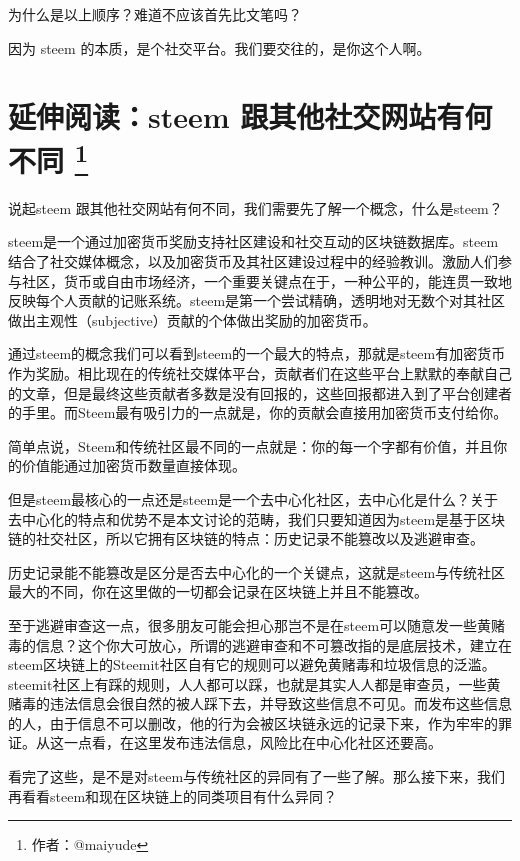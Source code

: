 \documentclass[]{ctexbook}
\begin{document}
为什么是以上顺序？难道不应该首先比文笔吗？

因为 steem 的本质，是个社交平台。我们要交往的，是你这个人啊。

\hypertarget{steem-}{%
\section[延伸阅读：steem 跟其他社交网站有何不同 ]{\texorpdfstring{延伸阅读：steem 跟其他社交网站有何不同 \footnote{作者：@maiyude}}{延伸阅读：steem 跟其他社交网站有何不同 }}\label{steem-}}

说起steem 跟其他社交网站有何不同，我们需要先了解一个概念，什么是steem？

steem是一个通过加密货币奖励支持社区建设和社交互动的区块链数据库。steem结合了社交媒体概念，以及加密货币及其社区建设过程中的经验教训。激励人们参与社区，货币或自由市场经济，一个重要关键点在于，一种公平的，能连贯一致地反映每个人贡献的记账系统。steem是第一个尝试精确，透明地对无数个对其社区做出主观性（subjective）贡献的个体做出奖励的加密货币。

通过steem的概念我们可以看到steem的一个最大的特点，那就是steem有加密货币作为奖励。相比现在的传统社交媒体平台，贡献者们在这些平台上默默的奉献自己的文章，但是最终这些贡献者多数是没有回报的，这些回报都进入到了平台创建者的手里。而Steem最有吸引力的一点就是，你的贡献会直接用加密货币支付给你。

简单点说，Steem和传统社区最不同的一点就是：你的每一个字都有价值，并且你的价值能通过加密货币数量直接体现。

但是steem最核心的一点还是steem是一个去中心化社区，去中心化是什么？关于去中心化的特点和优势不是本文讨论的范畴，我们只要知道因为steem是基于区块链的社交社区，所以它拥有区块链的特点：历史记录不能篡改以及逃避审查。

历史记录能不能篡改是区分是否去中心化的一个关键点，这就是steem与传统社区最大的不同，你在这里做的一切都会记录在区块链上并且不能篡改。

至于逃避审查这一点，很多朋友可能会担心那岂不是在steem可以随意发一些黄赌毒的信息？这个你大可放心，所谓的逃避审查和不可篡改指的是底层技术，建立在steem区块链上的Steemit社区自有它的规则可以避免黄赌毒和垃圾信息的泛滥。steemit社区上有踩的规则，人人都可以踩，也就是其实人人都是审查员，一些黄赌毒的违法信息会很自然的被人踩下去，并导致这些信息不可见。而发布这些信息的人，由于信息不可以删改，他的行为会被区块链永远的记录下来，作为牢牢的罪证。从这一点看，在这里发布违法信息，风险比在中心化社区还要高。

看完了这些，是不是对steem与传统社区的异同有了一些了解。那么接下来，我们再看看steem和现在区块链上的同类项目有什么异同？
\end{document}
